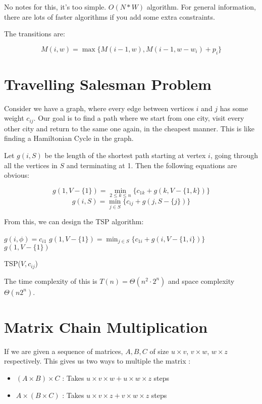 \documentclass[12pt,letterpaper]{article}
\theoremstyle{definition}
\begin{document}
No notes for this, it's too simple. $O(N*W)$ algorithm. For general information, there are lots of faster algorithms if you add some extra constraints.

The transitions are:

\[M(i,w) = \max\{M(i-1,w), M(i-1,w-w_i) + p_i\}\]

\section{Travelling Salesman Problem}

Consider we have a graph, where every edge between vertices $i$ and $j$ has some weight $c_{ij}$. Our goal is to find a path where we start from one city, visit every other city and return to the same one again, in the cheapest manner. This is like finding a Hamiltonian Cycle in the graph.

Let $g(i,S)$ be the length of the shortest path starting at vertex $i$, going through all the vertices in $S$ and terminating at 1. Then the following equations are obvious:

\[g(1,V-\{1\}) = \min_{2 \leq k \leq n} \{c_{1k} + g(k,V-\{1,k\})\}\]
\[g(i,S) = \min_{j \in S} \{c_{ij} + g(j,S-\{j\})\}\]

From this, we can design the TSP algorithm:

\begin{algorithm}[H]
  \SetAlgoLined
   {
    $g(i,\phi) = c_{i1}$
  }
  $g(1,V-\{1\}) = \min_{j \in S} \{c_{1i} + g(i,V-\{1,i\})\}$ \\
  \Return $g(1,V-\{1\})$
  \caption{TSP($V,c_{ij}$)}
\end{algorithm}

The time complexity of this is $T(n) = \Theta(n^2 \cdot 2^n)$ and space complexity $\Theta(n2^n)$.

\section{Matrix Chain Multiplication}

If we are given a sequence of matrices, $A,B,C$ of size $u \times v$, $v \times w$, $w \times z$ respectively. This gives us two ways to multiple the matrix : 

\begin{itemize}
  \item $(A \times B) \times C$ : Takes $u \times v \times w + u \times w \times z$ steps
  \item $A \times (B \times C)$ : Takes $u \times v \times z + v \times w \times z$ steps
\end{itemize}
\end{document}
